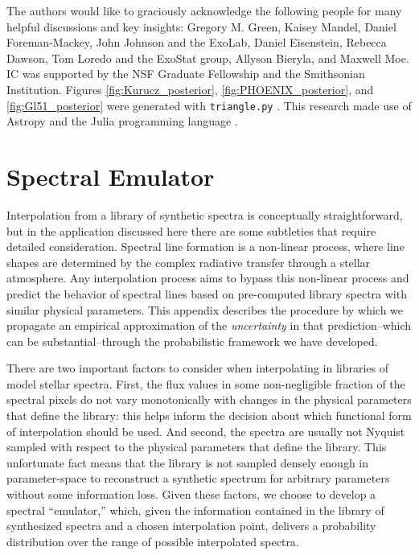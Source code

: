\documentclass[iop,floatfix,twocolappendix]{emulateapj}
\begin{document}
\acknowledgments  The authors would like to graciously acknowledge the following people for many helpful discussions and key insights: Gregory M. Green, Kaisey Mandel, Daniel Foreman-Mackey, John Johnson and the ExoLab, Daniel Eisenstein, Rebecca Dawson, Tom Loredo and the ExoStat group, Allyson Bieryla, and Maxwell Moe.  IC was supported by the NSF Graduate Fellowship and the Smithsonian Institution. Figures \ref{fig:Kurucz_posterior}, \ref{fig:PHOENIX_posterior}, and \ref{fig:Gl51_posterior} were generated with \texttt{triangle.py} \citep{foreman-mackey14}. This research made use of Astropy \citep{astropy13} and the Julia programming language \citep{julia12}.


\appendix

\section{Spectral Emulator} \label{sec:Appendix}

Interpolation from a library of synthetic spectra is conceptually straightforward, but in the 
application discussed here there are some subtleties that require detailed consideration.  
Spectral line formation is a non-linear process, where line shapes are determined by the complex 
radiative transfer through a stellar atmosphere.  Any interpolation process aims to bypass this non-linear 
process and predict the behavior of spectral lines based on pre-computed 
library spectra with similar physical parameters.  This appendix describes the 
procedure by which we propagate an empirical approximation of the {\it uncertainty} in that 
prediction--which can be substantial--through the probabilistic framework we have developed.

There are two important factors to consider when interpolating in libraries of model stellar 
spectra.  First, the flux values in some non-negligible fraction of the spectral pixels do not vary 
monotonically with changes in the physical parameters that define the library: this helps inform 
the decision about which functional form of interpolation should be used.  And second, the spectra 
are usually not Nyquist sampled with respect to the physical parameters that define the library.  
This unfortunate fact means that the library is not sampled densely enough in 
parameter-space to reconstruct a synthetic spectrum for arbitrary parameters without some 
information loss.  Given these factors, we choose to develop a spectral ``emulator,'' which, given the information contained in the library of synthesized spectra and a chosen interpolation point, delivers a probability distribution over the range of possible interpolated spectra. 
\end{document}
